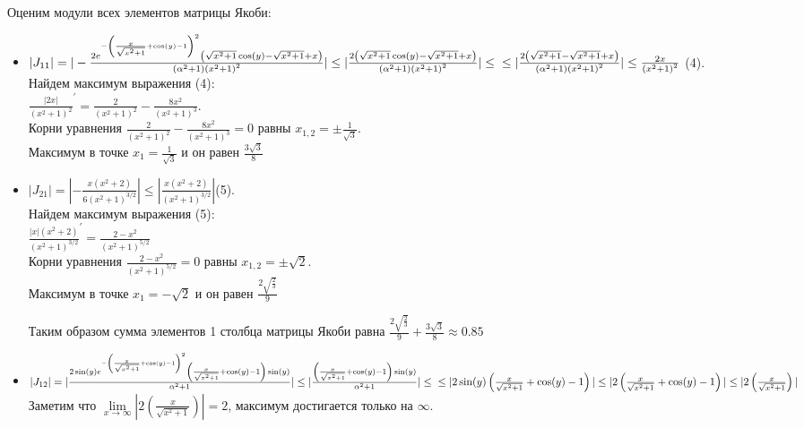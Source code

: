 \documentclass[a4paper, fontsize=14pt]{article}
\begin{document}
    Оценим модули всех элементов матрицы Якоби:
    \begin{itemize}
        \item $|J_{11}| = |-\frac{2 e^{-\left(\frac{x}{\sqrt{x^2+1}}+\cos(y)-1\right)^2} \left(\sqrt{x^2+1}\cos(y)-\sqrt{x^2+1}+x\right)}{\left(\alpha ^2+1\right) \left(x^2+1\right)^2}|  \leq |\frac{2 \left(\sqrt{x^2+1} \cos (y)-\sqrt{x^2+1}+x\right)}{\left(\alpha ^2+1\right) \left(x^2+1\right)^2}| \leq
	\\ \leq |\frac{2 \left(\sqrt{x^2+1}-\sqrt{x^2+1}+x\right)}{\left(\alpha ^2+1\right) \left(x^2+1\right)^2}| \leq \frac{2 x}{\left(x^2+1\right)^2}$ (4).
	\\ Найдем максимум выражения (4):
	\\${\frac{|2 x|}{\left(x^2+1\right)^2}}^\prime = \frac{2}{\left(x^2+1\right)^2}-\frac{8 x^2}{\left(x^2+1\right)^3}$.
	\\Корни уравнения $\frac{2}{\left(x^2+1\right)^2}-\frac{8 x^2}{\left(x^2+1\right)^3} = 0$ равны $x_{1,2} = \pm \frac{1}{\sqrt{3}}$.
	\\Максимум в точке $x_1 = \frac{1}{\sqrt{3}}$ и он равен $\frac{3 \sqrt{3}}{8}$

        \item $|J_{21}| =  |-\frac{x \left(x^2+2\right)}{6 \left(x^2+1\right)^{3/2}}| \leq |\frac{x \left(x^2+2\right)}{\left(x^2+1\right)^{3/2}}|$(5).
	\\Найдем максимум выражения (5):
	\\ ${\frac{|x| \left(x^2+2\right)}{\left(x^2+1\right)^{3/2}}}^\prime = \frac{2-x^2}{\left(x^2+1\right)^{5/2}} $
	\\Корни уравнения $ \frac{2-x^2}{\left(x^2+1\right)^{5/2}} = 0 $ равны $x_{1,2} = \pm \sqrt{2}$.
	\\Максимум в точке $x_1 = -\sqrt{2}$ и он равен $\frac{2 \sqrt{\frac{2}{3}}}{9} $

        Таким образом сумма элементов 1 столбца матрицы Якоби равна $\frac{2 \sqrt{\frac{2}{3}}}{9} + \frac{3 \sqrt{3}}{8} \approx 0.85  $

        \item $|J_{12}| = |\frac{2\sin(y)e^{-\left(\frac{x}{\sqrt{x^2+1}}+\cos (y)-1\right)^2} \left(\frac{x}{\sqrt{x^2+1}}+\cos (y)-1\right)\sin(y)}{\alpha ^2+1}| \leq |\frac{\left(\frac{x}{\sqrt{x^2+1}}+\cos (y)-1\right)\sin(y)}{\alpha ^2+1}|\leq
	\\ \leq |2 \sin (y) \left(\frac{x}{\sqrt{x^2+1}}+\cos (y)-1\right)| \leq |2 \left(\frac{x}{\sqrt{x^2+1}}+\cos (y)-1\right)| \leq |2\left(\frac{x}{\sqrt{x^2+1}}\right)|$
	Заметим что $\lim\limits_{x\to\infty}|2\left(\frac{x}{\sqrt{x^2+1}}\right)| = 2$, максимум достигается только на $\infty$.


\end{itemize}
\end{document}
